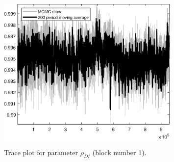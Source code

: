 \begin{figure}[H]
\centering
  \includegraphics[width=0.8\textwidth]{BRS_growth_util_sectoral/graphs/TracePlot_rho_DI_blck_1}\\
    \caption{Trace plot for parameter ${\rho_{DI}}$ (block number 1).}
\end{figure}
